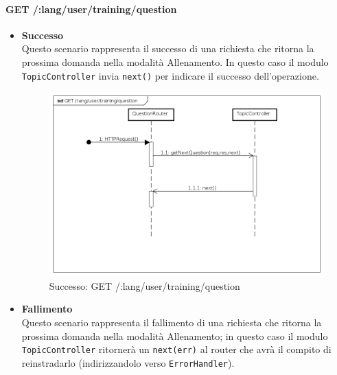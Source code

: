 \paragraph{GET /:lang/user/training/question} %
\begin{itemize}
\item \textbf{Successo}\\
Questo scenario rappresenta il successo di una richiesta che ritorna la prossima domanda nella modalità Allenamento. In questo caso il modulo \texttt{TopicController} invia \texttt{next()} per indicare il successo dell'operazione.

\begin{figure}[ht]
	\centering
	\includegraphics[scale=0.45]{UML/DiagrammiDiSequenza/Back-end/GET__lang_user_training_question_success.png}
	\caption{Successo: GET /:lang/user/training/question}
\end{figure}
\FloatBarrier

\item \textbf{Fallimento}\\
Questo scenario rappresenta il fallimento di una richiesta che ritorna la prossima domanda nella modalità Allenamento; in questo caso il modulo \texttt{TopicController} ritornerà un \texttt{next(err)} al router che avrà il compito di reinstradarlo (indirizzandolo verso \texttt{ErrorHandler}).


\end{itemize}
